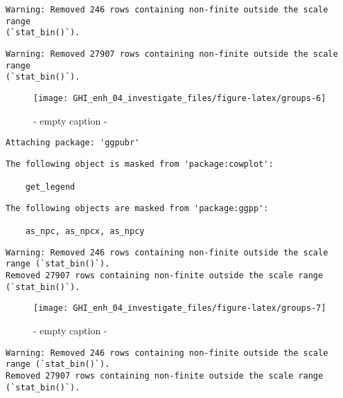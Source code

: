 \documentclass[
  10pt,
  a4paper,oneside]{article}
\begin{document}
\begin{verbatim}
Warning: Removed 246 rows containing non-finite outside the scale range
(`stat_bin()`).
\end{verbatim}

\begin{verbatim}
Warning: Removed 27907 rows containing non-finite outside the scale range
(`stat_bin()`).
\end{verbatim}

\begin{figure}[H]

{\centering \texttt{[image: GHI\_enh\_04\_investigate\_files/figure-latex/groups-6]} 

}

\caption{ - empty caption - }\label{fig:groups-6}
\end{figure}

\begin{verbatim}
Attaching package: 'ggpubr'
\end{verbatim}

\begin{verbatim}
The following object is masked from 'package:cowplot':

    get_legend
\end{verbatim}

\begin{verbatim}
The following objects are masked from 'package:ggpp':

    as_npc, as_npcx, as_npcy
\end{verbatim}

\begin{verbatim}
Warning: Removed 246 rows containing non-finite outside the scale range (`stat_bin()`).
Removed 27907 rows containing non-finite outside the scale range (`stat_bin()`).
\end{verbatim}

\begin{figure}[H]

{\centering \texttt{[image: GHI\_enh\_04\_investigate\_files/figure-latex/groups-7]} 

}

\caption{ - empty caption - }\label{fig:groups-7}
\end{figure}

\begin{verbatim}
Warning: Removed 246 rows containing non-finite outside the scale range (`stat_bin()`).
Removed 27907 rows containing non-finite outside the scale range (`stat_bin()`).
\end{verbatim}
\end{document}

